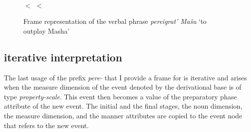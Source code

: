 \begin{figure}
\begin{minipage}{0.55\textwidth}
\end{minipage}\hfill%
\begin{minipage}{0.4\textwidth}\centering
{}\\
 $<$  $<$ 
\end{minipage}
\caption{Frame representation of the verbal phrase \textit{pereigrat' Ma\v{s}u} `to outplay Masha' \label{frame:outplay:Masha}}
\end{figure}

\subsection{iterative interpretation }
The last usage of the prefix \textit{pere-}   that I provide a frame for is iterative and arises when the measure dimension of the event denoted by the derivational base is of type \textit{property-scale}. This event then becomes a value of the preparatory phase attribute of the new event. The initial and the final stages, the noun dimension, the measure dimension, and the manner attributes are copied to the event node that refers to the new event. 

